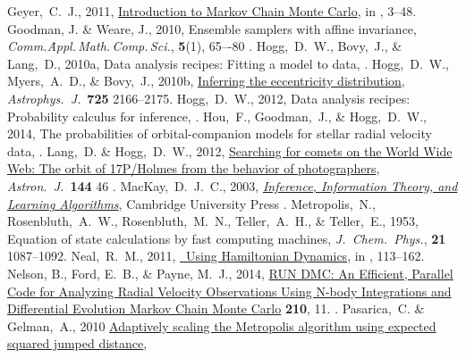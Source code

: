\documentclass[modern]{aastex61}
\newcommand{\MCMC}{\acronym{MCMC}}
\begin{document}
\begin{thebibliography}{}
  Geyer,~C.~J., 2011,
  \href{http://www.mcmchandbook.net/HandbookChapter1.pdf}{Introduction to Markov Chain Monte Carlo},
  in \citet{mcmchandbook}, 3--48.
  Goodman, J. \& Weare, J., 2010,
  Ensemble samplers with affine invariance,
  \textit{Comm.\.Appl.\,Math.\,Comp.\,Sci.}, \textbf{5}(1), 65–-80
  .
  Hogg,~D.~W., Bovy,~J., \& Lang,~D., 2010a,
  Data analysis recipes: Fitting a model to data,
  .
  Hogg,~D.~W., Myers,~A.~D., \& Bovy,~J., 2010b,
  \href{http://adsabs.harvard.edu/abs/2010ApJ...725.2166H}{Inferring the eccentricity distribution},
  \textit{Astrophys.\ J.}\ \textbf{725} 2166--2175.
  Hogg,~D.~W., 2012,
  Data analysis recipes: Probability calculus for inference,
  .
  Hou,~F., Goodman,~J., \& Hogg,~D.~W., 2014,
  The probabilities of orbital-companion models for stellar radial velocity data,
  .
  Lang,~D. \& Hogg,~D.~W., 2012,
  \href{http://adsabs.harvard.edu/abs/2012AJ....144...46L}{Searching for comets on the World Wide Web:
    The orbit of 17P/Holmes from the behavior of photographers},
  \textit{Astron.\ J.}\ \textbf{144} 46
  .
  MacKay,~D.~J.~C., 2003,
  \href{http://www.inference.phy.cam.ac.uk/mackay/itila/book.html}{\textit{Inference, Information Theory, and Learning Algorithms}},
  Cambridge University Press
  .
  Metropolis,~N., Rosenbluth,~A.~W., Rosenbluth,~M.~N., Teller,~A.~H., \& Teller,~E., 1953,
  Equation of state calculations by fast computing machines,
  \textit{J.\ Chem.\ Phys.}, \textbf{21} 1087--1092.
  Neal,~R.~M., 2011,
  \href{http://www.mcmchandbook.net/HandbookChapter5.pdf}{\MCMC\ Using Hamiltonian Dynamics},
  in \citet{mcmchandbook}, 113--162.
  Nelson, B., Ford, E.~B., \& Payne, M.~J., 2014,
  \href{http://adsabs.harvard.edu/abs/2014ApJS..210...11N}{RUN DMC: An
Efficient, Parallel Code for Analyzing Radial Velocity Observations Using
N-body Integrations and Differential Evolution Markov Chain Monte Carlo}
  \textbf{210}, 11.
  .
  Pasarica,~C. \& Gelman,~A., 2010
  \href{http://www.jstor.org/stable/24308995}{Adaptively scaling the Metropolis algorithm using expected squared jumped distance},

\end{thebibliography}
\end{document}
